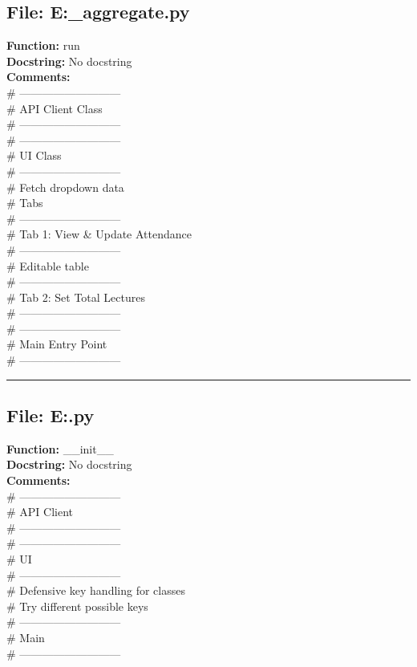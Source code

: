 {\subsection*{File: E:\project\capstone\frontend\faculty\attendance_aggregate.py}
\textbf{Function:} run\\
\textbf{Docstring:} No docstring\\
\textbf{Comments:}\\
# ---------------------------\\
# API Client Class\\
# ---------------------------\\
# ---------------------------\\
# UI Class\\
# ---------------------------\\
# Fetch dropdown data\\
# Tabs\\
# ---------------------------\\
# Tab 1: View & Update Attendance\\
# ---------------------------\\
# Editable table\\
# ---------------------------\\
# Tab 2: Set Total Lectures\\
# ---------------------------\\
# ---------------------------\\
# Main Entry Point\\
# ---------------------------\\

\hrule

\subsection*{File: E:\project\capstone\frontend\faculty\attendence.py}
\textbf{Function:} __init__\\
\textbf{Docstring:} No docstring\\
\textbf{Comments:}\\
# ---------------------------\\
# API Client\\
# ---------------------------\\
# ---------------------------\\
# UI\\
# ---------------------------\\
# Defensive key handling for classes\\
# Try different possible keys\\
# ---------------------------\\
# Main\\
# ---------------------------\\

}
